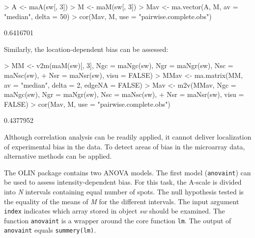 \documentclass[a4paper,11pt]{article}
\begin{document}
\begin{Schunk}
\begin{Sinput}
> A <- maA(sw[, 3])
> M <- maM(sw[, 3])
> Mav <- ma.vector(A, M, av = "median", delta = 50)
> cor(Mav, M, use = "pairwise.complete.obs")
\end{Sinput}
\begin{Soutput}
          [,1]
[1,] 0.6416701
\end{Soutput}
\end{Schunk}

Similarly, the location-dependent bias can be assessed: 

\begin{Schunk}
\begin{Sinput}
> MM <- v2m(maM(sw)[, 3], Ngc = maNgc(sw), Ngr = maNgr(sw), Nsc = maNsc(sw), 
+     Nsr = maNsr(sw), visu = FALSE)
> MMav <- ma.matrix(MM, av = "median", delta = 2, edgeNA = FALSE)
> Mav <- m2v(MMav, Ngc = maNgc(sw), Ngr = maNgr(sw), Nsc = maNsc(sw), 
+     Nsr = maNsr(sw), visu = FALSE)
> cor(Mav, M, use = "pairwise.complete.obs")
\end{Sinput}
\begin{Soutput}
          [,1]
[1,] 0.4377952
\end{Soutput}
\end{Schunk}

Although correlation analysis can be readily applied, it  cannot 
deliver localization of experimental bias in the data. 
To detect areas of bias in the microarray data, alternative methods can be applied. 

The OLIN package contains two ANOVA models. The first model (\texttt{anovaint}) can be used
to assess intensity-dependent bias. For this task, the A-scale is divided into \emph{N} intervals
containing equal number of spots. The null hypothesis tested is the equality of the means of \emph{M} for the different intervals.  The input argument \texttt{index} indicates which array stored in object \emph{sw}
 should
be examined. 
The function \texttt{anovaint}  is a wrapper around the core function \texttt{lm}. 
The output of  \texttt{anovaint} equals \texttt{summery(lm)}.
\end{document}
